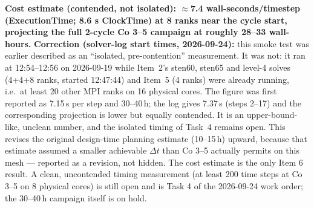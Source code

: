 \documentclass[11pt]{article}
\begin{document}
\textbf{Cost estimate (contended, not isolated): $\approx$7.4 wall-seconds/timestep (ExecutionTime; 8.6 s ClockTime) at
8 ranks near the cycle start, projecting the full 2-cycle Co 3--5 campaign at roughly 28--33
wall-hours.} \textbf{Correction (solver-log start times, 2026-09-24):} this smoke test was earlier described as an ``isolated, pre-contention'' measurement. It was not: it ran at 12:54--12:56 on 2026-09-19 while Item~2's sten60, sten65 and level-4 solves (4+4+8 ranks, started 12:47:44) and Item~5 (4 ranks) were already running, i.e.\ at least 20 other MPI ranks on 16 physical cores. The figure was first reported as 7.15\,s per step and 30--40\,h; the log gives 7.37\,s (steps 2--17) and the corresponding projection is lower but equally contended. It is an upper-bound-like, unclean number, and the isolated timing of Task~4 remains open. This revises the original design-time planning estimate (10--15\,h) upward, because that
estimate assumed a smaller achievable $\Delta t$ than Co 3--5 actually permits on this mesh --- reported
as a revision, not hidden. The cost estimate is the only Item 6 result. A clean, uncontended timing measurement (at least 200 time steps at Co 3--5 on 8 physical cores) is still open and is Task 4 of the 2026-09-24 work order; the 30--40\,h campaign itself is on hold.
\end{document}
